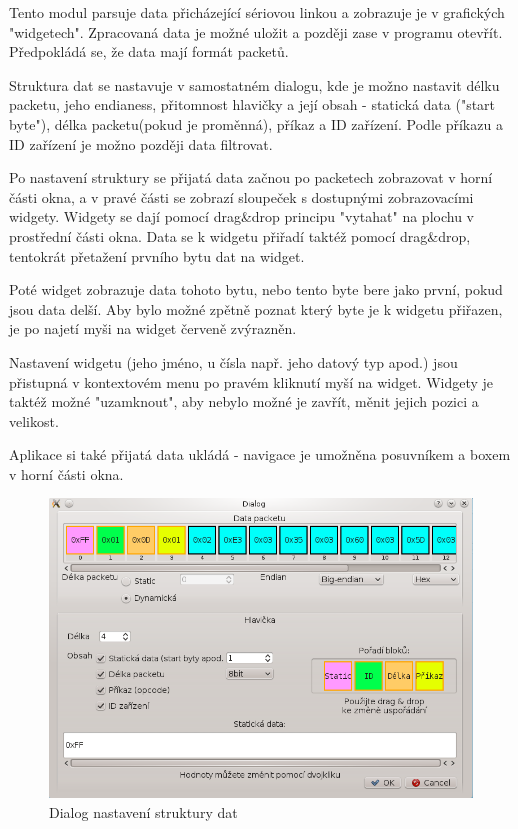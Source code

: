 \documentclass[12pt, a4paper, oneside]{article}
\begin{document}
Tento modul parsuje data přicházející sériovou linkou a zobrazuje je v grafických "widgetech". Zpracovaná data je možné uložit a později zase v programu otevřít. Předpokládá se, že data mají formát packetů.

Struktura dat se nastavuje v samostatném dialogu, kde je možno nastavit délku packetu, jeho endianess\cite{endian}, přitomnost hlavičky a její obsah - statická data ("start byte"), délka packetu(pokud je proměnná), příkaz a ID zařízení. Podle příkazu a ID zařízení je možno později data filtrovat.

Po nastavení struktury se přijatá data začnou po packetech zobrazovat v horní části okna, a v pravé části se zobrazí sloupeček s dostupnými zobrazovacími widgety. Widgety se dají pomocí drag\&drop principu "vytahat" na plochu v prostřední části okna. Data se k widgetu přiřadí taktéž pomocí drag\&drop, tentokrát přetažení prvního bytu dat na widget. 

\newpage
\setlength{\voffset}{0mm} %
\pagestyle{plain}

Poté widget zobrazuje data tohoto bytu, nebo tento byte bere jako první, pokud jsou data delší. Aby bylo možné zpětně poznat který byte je k widgetu přiřazen, je po najetí myši na widget červeně zvýrazněn.

Nastavení widgetu (jeho jméno, u čísla např. jeho datový typ apod.) jsou přistupná v kontextovém menu po pravém kliknutí myší na widget. Widgety je taktéž možné "uzamknout", aby nebylo možné je zavřít, měnit jejich pozici a velikost.

Aplikace si také přijatá data ukládá - navigace je umožněna posuvníkem a boxem v horní části okna.

\begin{figure}[h]
\begin{center}
\includegraphics[scale=0.7]{img/analyzer_struct.png}
\caption{Dialog nastavení struktury dat}
\label{Analyzer_struct}
\end{center}
\end{figure}
\end{document}
